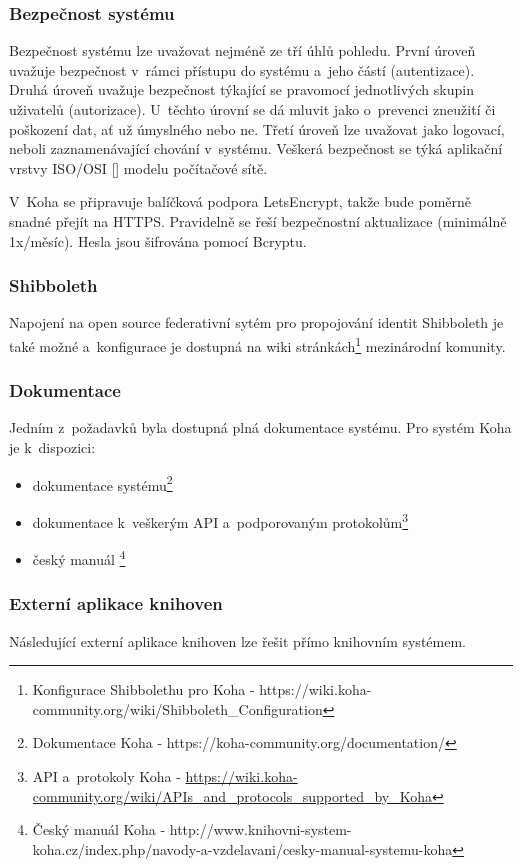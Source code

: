 \documentclass[
	11pt, oneside, printed, final, palatino, monochrome
	microtype,
	table,   %
	lof,     %
	lot     %
]{fithesis3}
\newcommand{\citepages}[2]{[\cite[#1]{#2}]}
\begin{document}
{\subsubsection{Bezpečnost systému}
Bezpečnost systému lze uvažovat nejméně ze tří úhlů pohledu. První úroveň uvažuje bezpečnost v~rámci přístupu do systému a~jeho částí (autentizace). Druhá úroveň uvažuje bezpečnost týkající se pravomocí jednotlivých skupin uživatelů (autorizace). U~těchto úrovní se dá mluvit jako o~prevenci zneužití či poškození dat, ať už úmyslného nebo ne. Třetí úroveň lze uvažovat jako logovací, neboli zaznamenávající chování v~systému. Veškerá bezpečnost se týká aplikační vrstvy ISO/OSI \citepages{80-82}{kurose_ross_2014} modelu počítačové sítě.

V~Koha se připravuje balíčková podpora LetsEncrypt, takže bude poměrně snadné přejít na HTTPS. Pravidelně se řeší bezpečnostní aktualizace (minimálně 1x/měsíc). Hesla jsou šifrována pomocí Bcryptu.

\subsubsection{Shibboleth}
Napojení na open source federativní sytém pro propojování identit Shibboleth je také možné a~konfigurace je dostupná na wiki stránkách\footnote{Konfigurace Shibbolethu pro Koha - https://wiki.koha-community.org/wiki/Shibboleth\_Configuration} mezinárodní komunity.

\subsubsection{Dokumentace}
Jedním z~požadavků byla dostupná plná dokumentace systému. Pro systém Koha je k~dispozici:

\begin{itemize}
\item dokumentace systému\footnote{Dokumentace Koha - https://koha-community.org/documentation/}
\item dokumentace k~veškerým API a~podporovaným protokolům\footnote{API a~protokoly Koha - \url{https://wiki.koha-community.org/wiki/APIs\_and\_protocols\_supported\_by\_Koha}}
\item český manuál \footnote{Český manuál Koha - http://www.knihovni-system-koha.cz/index.php/navody-a-vzdelavani/cesky-manual-systemu-koha}
\end{itemize}

\subsubsection{Externí aplikace knihoven}
Následující externí aplikace knihoven lze řešit přímo knihovním systémem.

}
\end{document}
